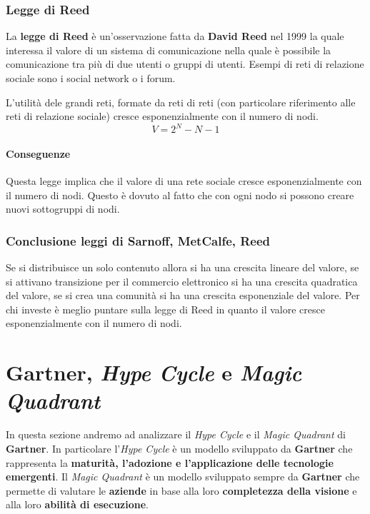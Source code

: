         \subsubsection{Legge di Reed}
            La \textbf{legge di Reed} è un'osservazione fatta da \textbf{David Reed} nel 1999 la quale interessa il valore di un sistema di comunicazione nella quale è possibile la comunicazione tra più di due utenti o gruppi di utenti. Esempi di reti di relazione sociale sono i social network o i forum.
            \begin{definition}
                L'utilità dele grandi reti, formate da reti di reti (con particolare riferimento alle reti di relazione sociale) cresce esponenzialmente con il numero di nodi. $$ V = 2^N - N - 1 $$
            \end{definition}
            \paragraph{Conseguenze} Questa legge implica che il valore di una rete sociale cresce esponenzialmente con il numero di nodi. Questo è dovuto al fatto che con ogni nodo si possono creare nuovi sottogruppi di nodi.
        \subsubsection{Conclusione leggi di Sarnoff, MetCalfe, Reed}
            Se si distribuisce un solo contenuto allora si ha una crescita lineare del valore, se si attivano transizione per il commercio elettronico si ha una crescita quadratica del valore, se si crea una comunità si ha una crescita esponenziale del valore. \newline Per chi investe è meglio puntare sulla legge di Reed in quanto il valore cresce esponenzialmente con il numero di nodi.
\section{Gartner, \textit{Hype Cycle} e \textit{Magic Quadrant}}
\label{sec:gartner}
    In questa sezione andremo ad analizzare il \textit{Hype Cycle} e il \textit{Magic Quadrant} di \textbf{Gartner}. In particolare l'\textit{Hype Cycle} è un modello sviluppato da \textbf{Gartner} che rappresenta la \textbf{maturità, l'adozione e l'applicazione delle tecnologie emergenti}. Il \textit{Magic Quadrant} è un modello sviluppato sempre da \textbf{Gartner} che permette di valutare le \textbf{aziende} in base alla loro \textbf{completezza della visione} e alla loro \textbf{abilità di esecuzione}.
